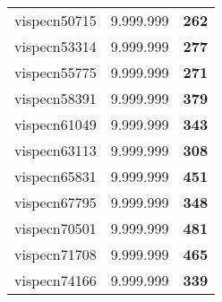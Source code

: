 \begin{tabular}{cc||c}
vispecn50715     & 9.999.999        & {\bf 262}       \\ 
vispecn53314     & 9.999.999        & {\bf 277}       \\ 
vispecn55775     & 9.999.999        & {\bf 271}       \\ 
vispecn58391     & 9.999.999        & {\bf 379}       \\ 
vispecn61049     & 9.999.999        & {\bf 343}       \\ 
vispecn63113     & 9.999.999        & {\bf 308}       \\ 
vispecn65831     & 9.999.999        & {\bf 451}       \\ 
vispecn67795     & 9.999.999        & {\bf 348}       \\ 
vispecn70501     & 9.999.999        & {\bf 481}       \\ 
vispecn71708     & 9.999.999        & {\bf 465}       \\ 
vispecn74166     & 9.999.999        & {\bf 339}       \\ 
\end{tabular}